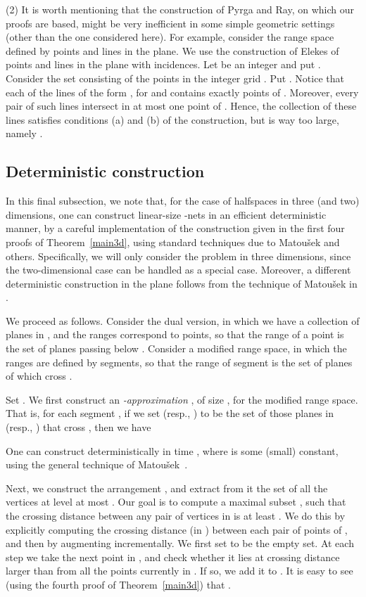 \documentclass[12pt]{article}
\providecommand{\Matousek}{Matou{\v s}ek\xspace}
\begin{document}
\medskip

\noindent
(2) It is worth mentioning that the construction of Pyrga and Ray, on
which our proofs are based, might be very inefficient in some simple
geometric settings (other than the one considered here). For example,
consider the range space defined by points and lines in the plane.  We
use the construction of Elekes \cite{e-spnta-02} of  points and 
lines in the plane with  incidences.  Let  be an
integer and put . Consider the set  consisting of the
points in the integer grid .  Put . Notice that each of the lines of the form ,
for  and  contains exactly 
points of . Moreover, every pair of such lines intersect in at most
one point of . Hence, the collection  of these lines satisfies
conditions (a) and (b) of the construction, but  is way too
large, namely .




\subsection{Deterministic construction}

In this final subsection, we note that, for the case of halfspaces in
three (and two) dimensions, one can construct linear-size -nets
in an efficient deterministic manner, by a careful implementation of
the construction given in the first four proofs of
Theorem~\ref{main3d}, using standard techniques due to \Matousek and
others. Specifically, we will only consider the problem in three
dimensions, since the two-dimensional case can be handled as a special
case. Moreover, a different deterministic construction in the plane
follows from the technique of \Matousek in \cite{m-cen-90}.

We proceed as follows. Consider the dual version, in which we have a
collection  of  planes in , and the ranges correspond
to points, so that the range of a point  is the set of planes
passing below . Consider a modified range space, in which the
ranges are defined by segments, so that the range of segment  is
the set of planes of  which cross .

Set . We first construct an \emph{-approximation}
, of size , for the modified range
space.  That is, for each segment , if we set  (resp., )
to be the set of those planes in  (resp., ) that cross , then
we have

One can construct  deterministically in time , where
 is some (small) constant, using the general technique of
\Matousek~\cite{m-dcg-96}.

Next, we construct the arrangement , and extract from it
the set  of all the vertices at level at most .
Our goal is to compute a maximal subset , such
that the crossing distance between any pair of vertices in 
is at least .
We do this by explicitly computing the crossing distance
(in ) between each pair of points of , and then by
augmenting  incrementally. We first set  to be the empty set.
At each step we take the next point  in , and check whether it
lies at crossing distance larger than  from all the points
currently in . If so, we add it to . It is easy to see
(using the fourth proof of Theorem~\ref{main3d}) that
.
\end{document}
